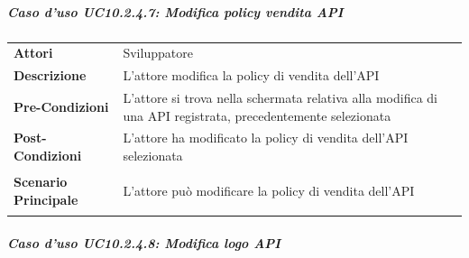 \subparagraph{Caso d'uso UC10.2.4.7: Modifica policy vendita API}
\label{UC10_2_4_7}

\begin{minipage}{\linewidth}
	\begin{tabular}{ l | p{11cm}}
		\hline
		\rowcolor{Gray}
		\multicolumn{2}{c}{UC10.2.4.7 - Modifica policy vendita API} \\
		\hline
		\textbf{Attori} & Sviluppatore \\
		\textbf{Descrizione} & L'attore modifica la policy di vendita dell'API \\
		\textbf{Pre-Condizioni} & L'attore si trova nella schermata relativa alla modifica di una API registrata, precedentemente selezionata \\
		\textbf{Post-Condizioni} & L'attore ha modificato la policy di vendita dell'API selezionata \\
		\textbf{Scenario Principale} & 
		\begin{enumerate*}[label=(\arabic*.),itemjoin={\newline}]
			\item L'attore può modificare la policy di vendita dell'API
		\end{enumerate*}\\
	\end{tabular}
\end{minipage}

\subparagraph{Caso d'uso UC10.2.4.8: Modifica logo API}
\label{UC10_2_4_8}

